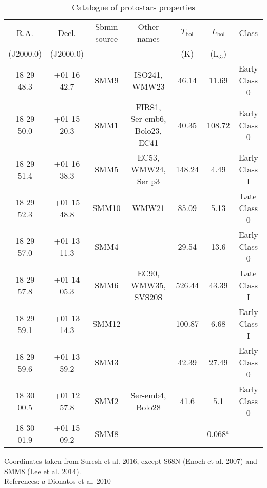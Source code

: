 \documentclass{aa}
\begin{document}
\begin{table*}
\caption{Catalogue of protostars properties}             %
\label{table:2}      %
\centering                          %
\begin{tabular}{c c c c c c c} 
\hline\hline 
R.A. & Decl. & Sbmm source & Other names & $T_\mathrm{bol}$ &  $L_\mathrm{bol}$  & Class\\
 (J2000.0) & (J2000.0) & & & (K) & (L$_\odot$) & \\
\hline  

18 29 48.3 & +01 16 42.7 & SMM9 & ISO241, WMW23& 46.14 & 11.69 & Early Class 0\\

18 29 50.0 & +01 15 20.3 & SMM1 & FIRS1, Ser-emb6, Bolo23, EC41 & 40.35 & 108.72 & Early Class 0\\

18 29 51.4 & +01 16 38.3 & SMM5 & EC53, WMW24, Ser p3 & 148.24 & 4.49 & Early Class I\\

18 29 52.3 & +01 15 48.8 & SMM10 & WMW21 & 85.09 & 5.13 & Late Class 0\\

18 29 57.0 & +01 13 11.3 & SMM4 & & 29.54 & 13.6 & Early Class 0\\

18 29 57.8 & +01 14 05.3 & SMM6 & EC90, WMW35, SVS20S & 526.44 & 43.39 & Late Class I\\

18 29 59.1 & +01 13 14.3 & SMM12 & & 100.87 & 6.68 & Early Class I\\

18 29 59.6 & +01 13 59.2 & SMM3 & & 42.39 & 27.49 & Early Class 0\\

18 30 00.5 & +01 12 57.8 & SMM2 & Ser-emb4, Bolo28 & 41.6 & 5.1 & Early Class 0\\

18 30 01.9 & +01 15 09.2 & SMM8 & & & 0.068$^a$ & \\
\hline
\end{tabular}
\begin{flushleft}
Coordinates taken from Suresh et al. 2016, except S68N (Enoch et al. 2007) and SMM8 (Lee et al. 2014).\\
References: $a$ Dionatos et al. 2010
\end{flushleft}
\end{table*}
\end{document}

